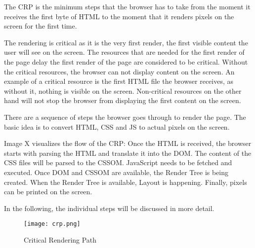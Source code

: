 
The CRP is the minimum steps that the browser has to take from the moment it receives the first byte of HTML to the moment that it renders pixels on the screen for the first time.

The rendering is critical as it is the very first render, the first visible content the user will see on the screen.
The resources that are needed for the first render of the page delay the first render of the page are considered to be critical.
Without the critical resources, the browser can not display content on the screen.
An example of a critical resource is the first HTML file the browser receives, as without it, nothing is visible on the screen.
Non-critical resources on the other hand will not stop the browser from displaying the first content on the screen. %








There are a sequence of steps the browser goes through to render the page.
The basic idea is to convert HTML, CSS and JS to actual pixels on the screen.

Image X visualizes the flow of the CRP:
Once the HTML is received, the browser starts with parsing the HTML and translate it into the DOM.
The content of the CSS files will be parsed to the CSSOM.
JavaScript needs to be fetched and executed.
Once DOM and CSSOM are available, the Render Tree is being created.
When the Render Tree is available, Layout is happening.
Finally, pixels can be printed on the screen.

In the following, the individual steps will be discussed in more detail.


\begin{figure}[h!]
\begin{center}
\texttt{[image: crp.png]}
\caption{Critical Rendering Path}
\label{img:crp}
\end{center}
\end{figure}




